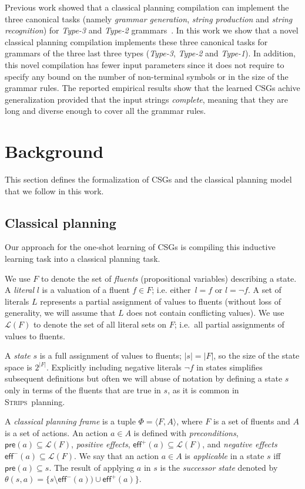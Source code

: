 \documentclass[letterpaper]{article} %
\newcommand{\tup}[1]{{\langle #1 \rangle}}
\newcommand{\pre}{\mathsf{pre}}     %
\newcommand{\eff}{\mathsf{eff}}     %
\newcommand{\strips}{\textsc{Strips}}     %
\begin{document}
Previous work showed that a classical planning compilation can implement the three canonical tasks (namely {\it grammar generation}, {\it string production} and {\it string recognition}) for {\em Type-3} and {\em Type-2} grammars~\cite{segovia2017generating}. In this work we show that a novel classical planning compilation implements these three canonical tasks for grammars of the three last three types ({\em Type-3}, {\em Type-2} and {\em Type-1}). In addition, this novel compilation has fewer input parameters since it does not require to specify any bound on the number of non-terminal symbols or in the size of the grammar rules. The reported empirical results show that the learned CSGs achive generalization provided that the input strings {\em complete}, meaning that they are long and diverse enough to cover all the grammar rules. 


\section{Background}
This section defines the formalization of CSGs and the classical planning model that we follow in this work.

\subsection{Classical planning}
Our approach for the one-shot learning of CSGs is compiling this inductive learning task into a classical planning task.

We use $F$ to denote the set of {\em fluents} (propositional variables) describing a state. A {\em literal} $l$ is a valuation of a fluent $f\in F$; i.e. either~$l=f$ or $l=\neg f$. A set of literals $L$ represents a partial assignment of values to fluents (without loss of generality, we will assume that $L$ does not contain conflicting values). We use $\mathcal{L}(F)$ to denote the set of all literal sets on $F$; i.e.~all partial assignments of values to fluents.

A {\em state} $s$ is a full assignment of values to fluents; $|s|=|F|$, so the size of the state space is $2^{|F|}$. Explicitly including negative literals $\neg f$ in states simplifies subsequent definitions but often we will abuse of notation by defining a state $s$ only in terms of the fluents that are true in $s$, as it is common in \strips\ planning.

A {\em classical planning frame} is a tuple $\Phi=\tup{F,A}$, where $F$ is a set of fluents and $A$ is a set of actions. An action $a\in A$ is defined with {\em preconditions}, $\pre(a)\subseteq\mathcal{L}(F)$, {\em positive effects}, $\eff^+(a)\subseteq\mathcal{L}(F)$, and {\em negative effects} $\eff^-(a)\subseteq\mathcal{L}(F)$. We say that an action $a\in A$ is {\em applicable} in a state $s$ iff $\pre(a)\subseteq s$. The result of applying $a$ in $s$ is the {\em successor state} denoted by $\theta(s,a)=\{s\setminus\eff^-(a))\cup\eff^+(a)\}$.
\end{document}
